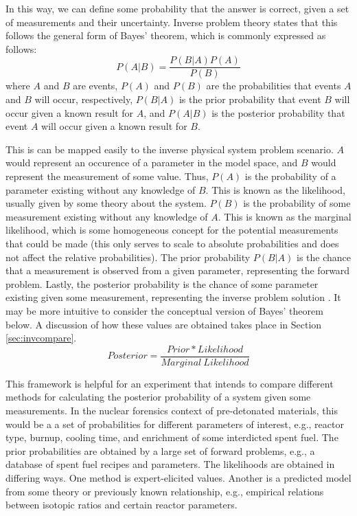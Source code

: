 In this way, we can define some probability that the answer is correct, given a
set of measurements and their uncertainty. Inverse problem theory states that
this follows the general form of Bayes' theorem, which is commonly expressed as
follows:
\begin{equation}
  P(A|B) = \frac{P(B|A)P(A)}{P(B)}
\end{equation}
where $A$ and $B$ are events, $P(A)$ and $P(B)$ are the probabilities that events
$A$ and $B$ will occur, respectively, $P(B|A)$ is the prior probability that event 
$B$ will occur given a known result for $A$, and $P(A|B)$ is the posterior 
probability that event $A$ will occur given a known result for $B$.

This is can be mapped easily to the inverse physical system problem scenario.
$A$ would represent an occurence of a parameter in the model space, and $B$
would represent the measurement of some value. Thus, $P(A)$ is the probability
of a parameter existing without any knowledge of $B$. This is known as the
likelihood, usually given by some theory about the system. $P(B)$ is the
probability of some measurement existing without any knowledge of $A$. This is
known as the marginal likelihood, which is some homogeneous concept for the
potential measurements that could be made (this only serves to scale to
absolute probabilities and does not affect the relative probabilities). The
prior probability $P(B|A)$ is the chance that a measurement is observed from a
given parameter, representing the forward problem.  Lastly, the posterior
probability is the chance of some parameter existing given some measurement,
representing the inverse problem solution \cite{inverse_theory}.  It may be
more intuitive to consider the conceptual version of Bayes' theorem below.  
A discussion of how these values are obtained takes place in Section
\ref{sec:invcompare}.
\begin{equation}
  Posterior = \frac{Prior * Likelihood}{Marginal \ Likelihood} 
\end{equation} 

This framework is helpful for an experiment that intends to compare different
methods for calculating the posterior probability of a system given some
measurements.  In the nuclear forensics context of pre-detonated materials,
this would be a a set of probabilities for different parameters of interest,
e.g., reactor type, burnup, cooling time, and enrichment of some interdicted
spent fuel. The prior probabilities are obtained by a large set of forward
problems, e.g., a database of spent fuel recipes and parameters. The
likelihoods are obtained in differing ways. One method is expert-elicited
values. Another is a predicted model from some theory or previously known
relationship, e.g., empirical relations between isotopic ratios and certain
reactor parameters. 
